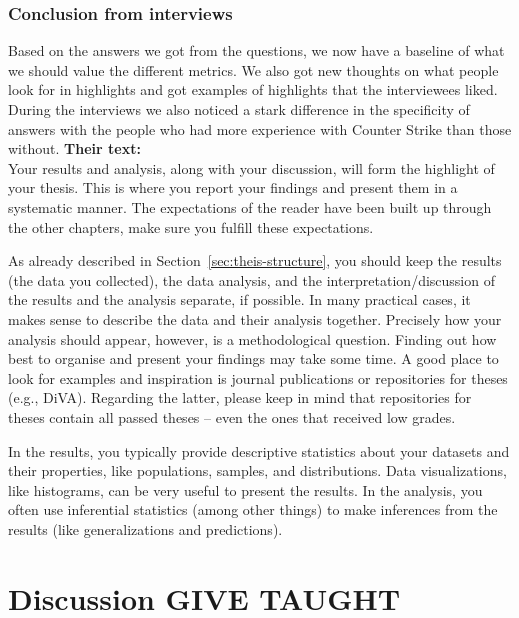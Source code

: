 \documentclass[a4paper,twoside]{bth}
\begin{document}
\subsection{Conclusion from interviews}
Based on the answers we got from the questions, we now have a baseline of what we should value the different metrics. We also got new thoughts on what people look for in highlights and got examples of highlights that the interviewees liked. During the interviews we also noticed a stark difference in the specificity of answers with the people who had more experience with Counter Strike than those without. 
\textbf{Their text:}\\
Your results and analysis, along with your discussion, will form the highlight of your thesis. This is where you report your findings and present them in a systematic manner. The expectations of the reader have been built up through the other chapters, make sure you fulfill these expectations.

As already described in Section~\ref{sec:theis-structure}, you should keep the results (the data you collected), the data analysis, and the interpretation/discussion of the results and the analysis separate, if possible. In many practical cases, it makes sense to describe the data and their analysis together.
Precisely how your analysis should appear, however, is a methodological question. Finding out how best to organise and present your findings may take some time. A good place to look for examples and inspiration is journal publications or repositories for theses (e.g., DiVA). Regarding the latter, please keep in mind that repositories for theses contain all passed theses -- even the ones that received low grades. 

In the results, you typically provide descriptive statistics about your datasets and their properties, like populations, samples, and distributions.
Data visualizations, like histograms, can be very useful to present the results. In the analysis, you often use inferential statistics (among other things) to make inferences from the results (like generalizations and predictions).


\chapter{Discussion GIVE TAUGHT}
\label{chp:discussion}
\end{document}
